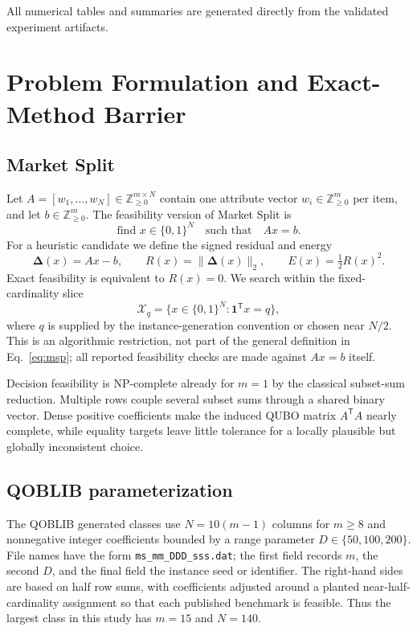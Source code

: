 \documentclass[11pt]{article}
\newcommand{\Z}{\mathbb{Z}}
\newcommand{\B}{\{0,1\}}
\newcommand{\res}{\boldsymbol{\Delta}}
\begin{document}
All numerical tables and summaries are generated directly from the validated experiment artifacts.

\section{Problem Formulation and Exact-Method Barrier}\label{sec:problem}
\subsection{Market Split}
Let $A=[w_1,\ldots,w_N]\in\Z_{\geq0}^{m\times N}$ contain one attribute vector $w_i\in\Z_{\geq0}^{m}$ per item, and let $b\in\Z_{\geq0}^{m}$. The feasibility version of Market Split is
\begin{equation}
  \text{find }x\in\B^N\quad\text{such that}\quad Ax=b.
  \label{eq:msp}
\end{equation}
For a heuristic candidate we define the signed residual and energy
\begin{equation}
  \res(x)=Ax-b,\qquad R(x)=\|\res(x)\|_2,
  \qquad E(x)=\tfrac12R(x)^2.
  \label{eq:residual}
\end{equation}
Exact feasibility is equivalent to $R(x)=0$. We search within the fixed-cardinality slice
\begin{equation}
  \mathcal{X}_q=\{x\in\B^N:\mathbf{1}^{\mathsf T}x=q\},
  \label{eq:cardinality}
\end{equation}
where $q$ is supplied by the instance-generation convention or chosen near $N/2$. This is an algorithmic restriction, not part of the general definition in Eq.~\eqref{eq:msp}; all reported feasibility checks are made against $Ax=b$ itself.

Decision feasibility is NP-complete already for $m=1$ by the classical subset-sum reduction. Multiple rows couple several subset sums through a shared binary vector. Dense positive coefficients make the induced QUBO matrix $A^{\mathsf T}A$ nearly complete, while equality targets leave little tolerance for a locally plausible but globally inconsistent choice.

\subsection{QOBLIB parameterization}
The QOBLIB generated classes use $N=10(m-1)$ columns for $m\geq8$ and nonnegative integer coefficients bounded by a range parameter $D\in\{50,100,200\}$. File names have the form \texttt{ms\_mm\_DDD\_sss.dat}; the first field records $m$, the second $D$, and the final field the instance seed or identifier. The right-hand sides are based on half row sums, with coefficients adjusted around a planted near-half-cardinality assignment so that each published benchmark is feasible. Thus the largest class in this study has $m=15$ and $N=140$.
\end{document}
